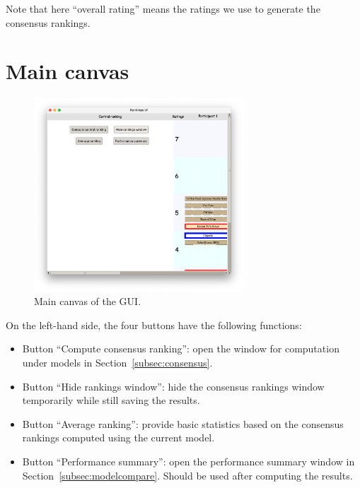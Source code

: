 \documentclass[a4paper,11pt]{memoir}
\begin{document}
Note that here ``overall rating'' means the ratings we use to generate the consensus rankings.

\section{Main canvas}

  \begin{figure}
    \begin{center}
      \includegraphics[width=0.7\textwidth]{art/base.png}
      \caption{Main canvas of the GUI.}\label{fig:base}
    \end{center}
  \end{figure}

On the left-hand side, the four buttons have the following functions:

\begin{itemize}
\item Button ``Compute consensus ranking'': open the window for computation under models in Section~\ref{subsec:consensus}.

\item Button ``Hide rankings window'': hide the consensus rankings window temporarily while still saving the results.

\item Button ``Average ranking'': provide basic statistics based on the consensus rankings computed using the current model.

\item Button ``Performance summary'': open the performance summary window in Section~\ref{subsec:modelcompare}. Should be used after computing the results.
\end{itemize}
\end{document}
